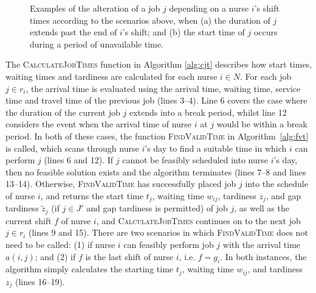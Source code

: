 \documentclass[a4paper,11pt,authoryear]{elsarticle}
\begin{document}
\begin{figure}[h!]
	\centering	
	\begin{subfigure}[h]{\textwidth}
		\centering
		
		\vspace{-2mm}\caption{}
		\label{fig:itemsinfeas}
		\vspace{2mm}
	\end{subfigure}
	\begin{subfigure}[h]{\textwidth}
		\centering
		
		\vspace{-2mm}\caption{}
		\label{fig:itemsfeas}
	\end{subfigure}
	\caption{Examples of the alteration of a job $j$ depending on a nurse $i$'s shift times according to the scenarios above, when (a) the duration of $j$ extends past the end of $i$'s shift; and (b) the start time of $j$ occurs during a period of unavailable time.}
	\label{fig:itemsaligned}
\end{figure}
\noindent The \textsc{CalculateJobTimes} function in Algorithm \ref{alg:cjt} describes how start times, waiting times and tardiness are calculated for each nurse $i \in N$. For each job $j \in r_i$, the arrival time is evaluated using the arrival time, waiting time, service time and travel time of the previous job (lines 3--4). Line 6 covers the case where the duration of the current job $j$ extends into a break period, whilst line 12 considers the event when the arrival time of nurse $i$ at $j$ would be within a break period. In both of these cases, the function \textsc{FindValidTime} in Algorithm~\ref{alg:fvt} is called, which scans through nurse $i$'s day to find a suitable time in which $i$ can perform $j$ (lines 6 and 12). If $j$ cannot be feasibly scheduled into nurse $i$'s day, then no feasible solution exists and the algorithm terminates (lines 7--8 and lines 13--14). Otherwise, \textsc{FindValidTime} has successfully placed job $j$ into the schedule of nurse $i$, and returns the start time $t_j$, waiting time $w_{ij}$, tardiness $z_j$, and gap tardiness $\tilde{z}_j$ (if $j \in J'$ and gap tardiness is permitted) of job $j$, as well as the current shift $f$ of nurse $i$, and \textsc{CalculateJobTimes} continues on to the next job $j \in r_i$ (lines 9 and 15). There are two scenarios in which \textsc{FindValidTime} does not need to be called: (1) if nurse $i$ can feasibly perform job $j$ with the arrival time $a(i,j)$; and (2) if $f$ is the last shift of nurse $i$, i.e. $f = g_i$. In both instances, the algorithm simply calculates the starting time $t_j$, waiting time $w_{ij}$, and tardiness $z_j$ (lines 16--19).
\end{document}
